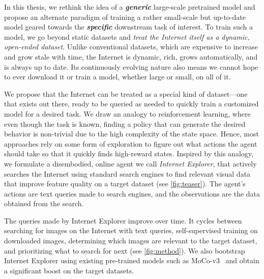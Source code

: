 In this thesis, we rethink the idea of a \textit{\textbf{generic}} large-scale pretrained model and propose an alternate paradigm of training a rather small-scale but up-to-date model geared towards the \textit{\textbf{specific}} downstream task of interest. To train such a model, we go beyond static datasets and \textit{treat the Internet itself as a dynamic, open-ended dataset}. Unlike conventional datasets, which are expensive to increase and grow stale with time,
the Internet is dynamic, rich, grows automatically, and is always up to date.
Its continuously evolving nature also means we cannot hope to ever download it or train a model, whether large or small, on all of it.

We propose that the Internet can be treated as a special kind of dataset---one that exists out there, ready to be queried as needed to quickly train a customized model for a desired task.
We draw an analogy to reinforcement learning, where even though the task is known, finding a policy that can generate the desired behavior is non-trivial due to the high complexity of the state space. Hence, most approaches rely on some form of exploration to figure out what actions the agent should take so that it quickly finds high-reward states. Inspired by this analogy, we formulate a disembodied, online agent we call {\em Internet Explorer}, that actively searches the Internet using standard search engines to find relevant visual data that improve feature quality on a target dataset (see \cref{fig:teaser}). The agent's actions are text queries made to search engines, and the observations are the data obtained from the search.

The queries made by Internet Explorer improve over time. It cycles between searching for images on the Internet with text queries, self-supervised training on downloaded images, determining which images are relevant to the target dataset, and prioritizing what to search for next (see \cref{fig:method}). We also bootstrap Internet Explorer using existing pre-trained models such as MoCo-v3~\cite{he2020momentum} and obtain a significant boost on the target datasets.

